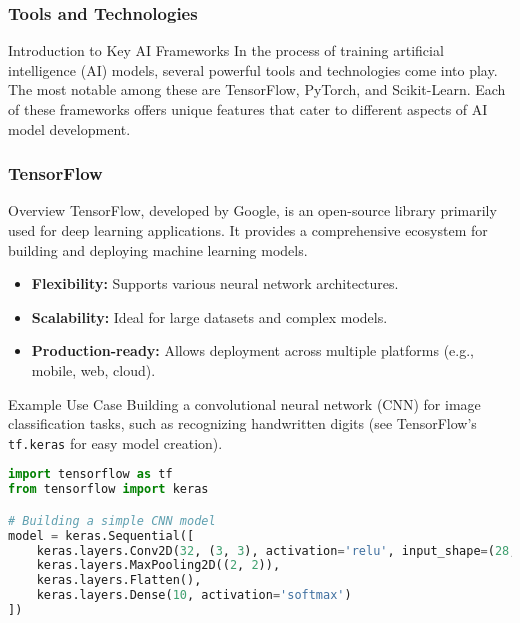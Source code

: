 \documentclass{beamer}
\begin{document}
\begin{frame}
    \frametitle{Tools and Technologies}
    \begin{block}{Introduction to Key AI Frameworks}
        In the process of training artificial intelligence (AI) models, several powerful tools and technologies come into play. The most notable among these are TensorFlow, PyTorch, and Scikit-Learn. Each of these frameworks offers unique features that cater to different aspects of AI model development.
    \end{block}
\end{frame}

\begin{frame}[fragile]
    \frametitle{TensorFlow}
    \begin{block}{Overview}
        TensorFlow, developed by Google, is an open-source library primarily used for deep learning applications. It provides a comprehensive ecosystem for building and deploying machine learning models.
    \end{block}
    
    \begin{itemize}
        \item \textbf{Flexibility:} Supports various neural network architectures.
        \item \textbf{Scalability:} Ideal for large datasets and complex models.
        \item \textbf{Production-ready:} Allows deployment across multiple platforms (e.g., mobile, web, cloud).
    \end{itemize}

    \begin{block}{Example Use Case}
        Building a convolutional neural network (CNN) for image classification tasks, such as recognizing handwritten digits (see TensorFlow's \texttt{tf.keras} for easy model creation).
    \end{block}

    \begin{lstlisting}[language=Python]
import tensorflow as tf
from tensorflow import keras

# Building a simple CNN model
model = keras.Sequential([
    keras.layers.Conv2D(32, (3, 3), activation='relu', input_shape=(28, 28, 1)),
    keras.layers.MaxPooling2D((2, 2)),
    keras.layers.Flatten(),
    keras.layers.Dense(10, activation='softmax')
])
    \end{lstlisting}
\end{frame}
\end{document}
